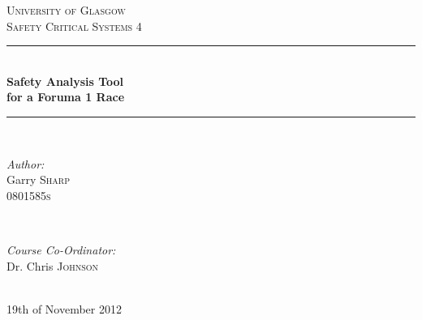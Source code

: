 \documentclass[12pt]{article} %
\begin{document}

\begin{titlepage}

\newcommand{\HRule}{\rule{\linewidth}{0.5mm}} %

\center %

\textsc{\LARGE University of Glasgow}\\[1.5cm] %
\textsc{\Large Safety Critical Systems 4}\\[0.5cm] %

\HRule \\[0.4cm]
{ \huge \bfseries Safety Analysis Tool\\ for a Foruma 1 Race }\\[0.4cm] %
\HRule \\[1.5cm]

\begin{minipage}{0.4\textwidth}
\begin{flushleft} \large
\emph{Author:}\\
Garry \textsc{Sharp}\\ %
\textsc{0801585s}
\end{flushleft}
\end{minipage}
~
\begin{minipage}{0.4\textwidth}
\begin{flushright} \large
\emph{Course Co-Ordinator:} \\
Dr. Chris \textsc{Johnson} %
\end{flushright}
\end{minipage}\\[4cm]

{\large 19th of November 2012}\\[3cm] %


\vfill %

\end{titlepage}
\end{document}
